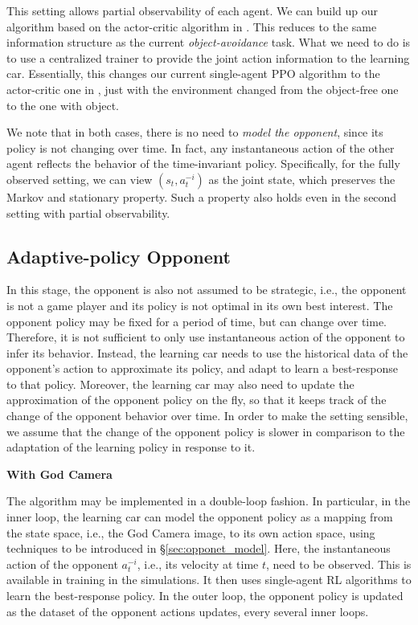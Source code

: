 This setting allows partial observability of each agent. We can  build up our algorithm based on the actor-critic  algorithm in \cite{lowe2017multi}. This reduces to the same information  structure as the current \emph{object-avoidance} task. What we need to do is to use a centralized trainer to  provide the joint action information  to the learning car. Essentially, this changes our current single-agent PPO algorithm to the actor-critic one in \cite{lowe2017multi}, just with the environment changed from the object-free one to the one with object. 


We note that in both cases, there is no need to \emph{model the opponent}, since its policy is not changing over time. In fact,  any instantaneous  action of the other agent reflects the behavior of the time-invariant policy. Specifically, for the fully observed setting, we can view $(s_t,a^{-i}_t)$ as the joint state, which preserves the Markov and stationary property. Such a property also holds even  in the second setting with partial observability.  

\subsection{Adaptive-policy Opponent}

In this stage, the opponent is also not assumed to be strategic, i.e., the opponent is not a game player and its policy is not optimal in its own best interest.  The opponent  policy  may be fixed for a period of  time, but can change over time. 
Therefore, it is not sufficient to only use instantaneous action of the opponent to infer its behavior. Instead, the learning car needs to use the historical data of the opponent's action to approximate its policy, and adapt to learn a best-response to that policy. Moreover, the learning car may also need to update the approximation of the opponent policy on the fly, so that it keeps track of the change of the opponent behavior over time. 
In order to make the setting sensible, we assume that the change of the opponent policy is slower in comparison to the adaptation of the learning policy in response to it. 


\vspace{7pt}
\noindent\textbf{With God Camera}
\vspace{3pt}

 
 The algorithm may be implemented in a double-loop fashion. In particular, in the inner loop, the learning car can model the opponent policy as a mapping from the state space, i.e., the God Camera image, to its own action space, using techniques to be introduced in \S\ref{sec:opponet_model}. 
 Here, the instantaneous action of the opponent $a^{-i}_t$, i.e., its velocity at time $t$, need to be observed. 
 This is available in training in the simulations. 
 It then uses single-agent RL algorithms to learn the best-response policy. 
In the outer loop, the opponent policy is updated as the dataset of the opponent actions updates, every several inner loops.  


